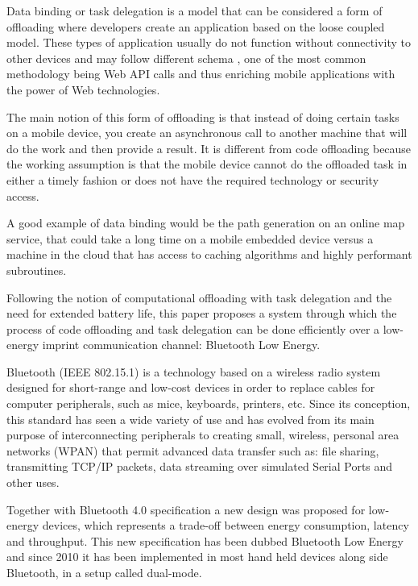 Data binding or task delegation is a model that can be considered a form of offloading where developers create an application based on the loose coupled model. These types of application usually do not function without connectivity to other devices and may follow different schema \cite{klein2010access}, one of the most common methodology being Web API calls and thus enriching mobile applications with the power of Web technologies. 

The main notion of this form of offloading is that instead of doing certain tasks on a mobile device, you create an asynchronous call to another machine that will do the work and then provide a result. It is different from code offloading because the working assumption is that the mobile device cannot do the offloaded task in either a timely fashion or does not have the required technology or security access. 

A good example of data binding would be the path generation on an online map service, that could take a long time on a mobile embedded device versus a machine in the cloud that has access to caching algorithms and highly performant subroutines.

Following the notion of computational offloading with task delegation and the need for extended battery life, this paper proposes a system through which the process of code offloading and task delegation can be done efficiently over a low-energy imprint communication channel: Bluetooth Low Energy. 

Bluetooth (IEEE 802.15.1) is a technology based on a wireless radio system designed for short-range and low-cost devices in order to replace cables for computer peripherals, such as mice, keyboards, printers, etc. Since its conception, this standard has seen a wide variety of use and has evolved from its main purpose of interconnecting peripherals to creating small, wireless, personal area networks (WPAN) that permit advanced data transfer such as: file sharing, transmitting TCP/IP packets, data streaming over simulated Serial Ports and other uses.

Together with Bluetooth 4.0 specification a new design was proposed for low-energy devices, which represents a trade-off between energy consumption, latency and throughput. This new specification has been dubbed Bluetooth Low Energy  and since 2010 it has been implemented in most hand held devices along side Bluetooth, in a setup called dual-mode.

